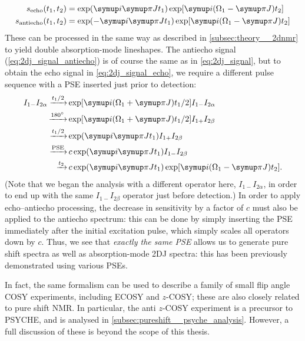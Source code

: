 \begin{align}
    s_\text{echo}(t_1, t_2) &= \exp(\mi\cpi Jt_1) \exp[\mi(\Omega_1 - \cpi J) t_2] \label{eq:2dj_signal_echo} \\
    s_\text{antiecho}(t_1, t_2) &= \exp(-\mi\cpi Jt_1) \exp[\mi(\Omega_1 - \cpi J)t_2] \label{eq:2dj_signal_antiecho}
\end{align}
These can be processed in the same way as described in \cref{subsec:theory__2dnmr} to yield double absorption-mode lineshapes.
The antiecho signal (\cref{eq:2dj_signal_antiecho}) is of course the same as in \cref{eq:2dj_signal}, but to obtain the echo signal in \cref{eq:2dj_signal_echo}, we require a different pulse sequence with a PSE inserted just prior to detection:
\begin{align}
    \label{eq:2dj_signal_echo_ctp}
    I_{1-}I_{2\alpha} \xrightarrow[]{t_1/2} &\exp[\mi(\Omega_1 + \cpi J)t_1/2] I_{1-}I_{2\alpha} \\
    \xrightarrow[]{\ang{180}} &\exp[\mi(\Omega_1 + \cpi J)t_1/2] I_{1+}I_{2\beta} \\
    \xrightarrow[]{t_1/2} &\exp(\mi\cpi Jt_1) I_{1+}I_{2\beta} \\
    \xrightarrow[]{\text{PSE}} &\,c \exp(\mi\cpi Jt_1) I_{1-}I_{2\beta} \\
    \xrightarrow[]{t_2} &\,c \exp(\mi\cpi Jt_1) \exp[\mi(\Omega_1 - \cpi J)t_2].
\end{align}
(Note that we began the analysis with a different operator here, $I_{1-}I_{2\alpha}$, in order to end up with the same $I_{1-}I_{2\beta}$ operator just before detection.)
In order to apply echo--antiecho processing, the decrease in sensitivity by a factor of $c$ must also be applied to the antiecho spectrum: this can be done by simply inserting the PSE immediately after the initial excitation pulse, which simply scales all operators down by $c$.
Thus, we see that \textit{exactly the same PSE} allows us to generate pure shift spectra as well as absorption-mode 2DJ spectra: this has been previously demonstrated using various PSEs.\autocite{Pell2007JMR,Foroozandeh2015CC}

In fact, the same formalism can be used to describe a family of small flip angle COSY experiments, including ECOSY\autocite{Griesinger1985JACS,Sorensen1985JACS,Griesinger1986JCP} and $z$-COSY\autocite{Oschkinat1986JMR,Pell2007MRC,Moutzouri2020ACIE}; these are also closely related to pure shift NMR.
In particular, the anti $z$-COSY experiment is a precursor to PSYCHE, and is analysed in \cref{subsec:pureshift__psyche_analysis}.
However, a full discussion of these is beyond the scope of this thesis.
